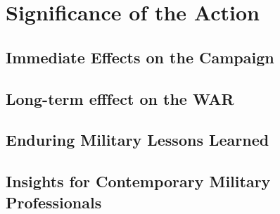 \section{Significance of the Action}
\subsection{Immediate Effects on the Campaign}
\subsection{Long-term efffect on the WAR}
\subsection{Enduring Military Lessons Learned}
\subsection{Insights for Contemporary Military Professionals}
